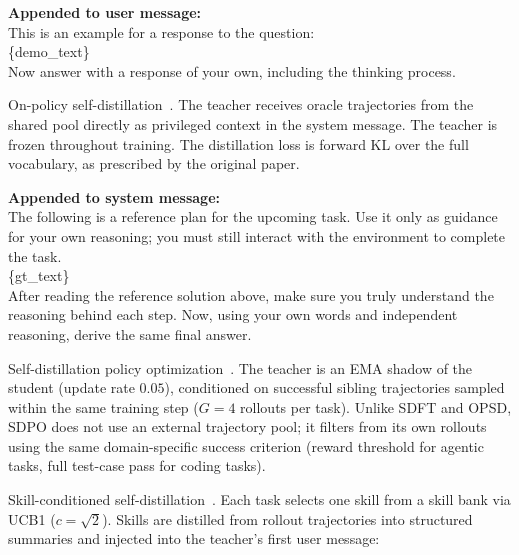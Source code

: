 \documentclass{article} %
\begin{document}
\begin{tcolorbox}[before skip=4pt, after skip=1pt, colback=SeaGreen!6, colframe=SeaGreen!50!black, fontupper=\ttfamily\scriptsize, boxrule=0.5pt, left=4pt, right=4pt, top=3pt, bottom=3pt, title={\small\bfseries SDFT demonstration injection format}]
\textbf{Appended to user message:}\\
This is an example for a response to the question:\\
\{demo\_text\}\\[0.3em]
Now answer with a response of your own, including the thinking process.
\end{tcolorbox}

On-policy self-distillation~\citep{zhao2026selfdistilledreasoneronpolicyselfdistillation}. The teacher receives oracle trajectories from the shared pool directly as privileged context in the system message. The teacher is frozen throughout training. The distillation loss is forward KL over the full vocabulary, as prescribed by the original paper.

\begin{tcolorbox}[before skip=4pt, after skip=1pt, colback=SeaGreen!6, colframe=SeaGreen!50!black, fontupper=\ttfamily\scriptsize, boxrule=0.5pt, left=4pt, right=4pt, top=3pt, bottom=3pt, title={\small\bfseries OPSD GT injection format}]
\textbf{Appended to system message:}\\
The following is a reference plan for the upcoming task. Use it only as guidance for your own reasoning; you must still interact with the environment to complete the task.\\
\{gt\_text\}\\[0.3em]
After reading the reference solution above, make sure you truly understand the reasoning behind each step. Now, using your own words and independent reasoning, derive the same final answer.
\end{tcolorbox}

Self-distillation policy optimization~\citep{hbotter2026reinforcementlearningselfdistillation}. The teacher is an EMA shadow of the student (update rate $0.05$), conditioned on successful sibling trajectories sampled within the same training step ($G{=}4$ rollouts per task). Unlike SDFT and OPSD, SDPO does not use an external trajectory pool; it filters from its own rollouts using the same domain-specific success criterion (reward threshold for agentic tasks, full test-case pass for coding tasks).

Skill-conditioned self-distillation~\citep{wang2026skillsdskillconditionedselfdistillationmultiturn}. Each task selects one skill from a skill bank via UCB1 ($c{=}\sqrt{2}$). Skills are distilled from rollout trajectories into structured summaries and injected into the teacher's first user message:
\end{document}
